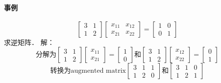 \documentclass[12pt]{article}
\begin{document}
\begin{CJK}{UTF8}{gbsn}
\paragraph{事例}
\begin{equation}
\left[
\begin{array}{cc}
3 & 1 \\
1 & 2
\end{array}
\right]
\left[
\begin{array}{cc}
x_{11} & x_{12} \\
x_{21} & x_{22}
\end{array}
\right]
=
\left[
\begin{array}{cc}
1 & 0 \\
0 & 1
\end{array}
\right]
\end{equation}
求逆矩阵．
解：
\begin{equation}
\text{分解为}
\left[
\begin{array}{cc}
3 & 1 \\
1 & 2
\end{array}
\right]
\left[
\begin{array}{c}
x_{11} \\
x_{21}
\end{array}
\right]
=
\left[
\begin{array}{cc}
1 \\
0
\end{array}
\right]
\text{和}
\left[
\begin{array}{cc}
3 & 1 \\
1 & 2
\end{array}
\right]
\left[
\begin{array}{c}
x_{12} \\
x_{22}
\end{array}
\right]
=
\left[
\begin{array}{cc}
0 \\
1
\end{array}
\right]
\end{equation}
\begin{equation}
\text{转换为augmented matrix}
\left[
\begin{array}{ccc}
3 & 1 & 1\\
1 & 2 & 0
\end{array}
\right]
\text{和}
\left[
\begin{array}{ccc}
3 & 1 & 0\\
1 & 2 & 1
\end{array}
\right]
\end{equation}

\end{CJK}
\end{document}
